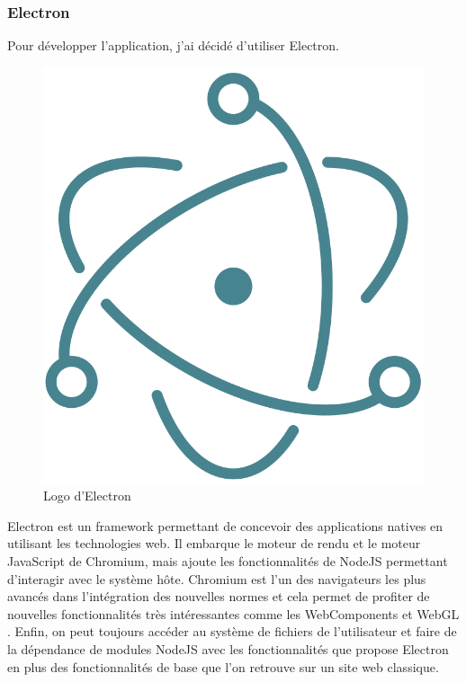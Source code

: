 \subsubsection{Electron}

Pour développer l'application, j'ai décidé d'utiliser Electron.

\begin{figure}[h]
    \centering
    \includegraphics[scale=0.2]{img/electron.png}
    \caption{Logo d’Electron}
\end{figure}

Electron est un framework permettant de concevoir des applications natives en utilisant les technologies web.
Il embarque le moteur de rendu et le moteur JavaScript de Chromium, mais ajoute les fonctionnalités de NodeJS permettant d'interagir avec le système hôte.
Chromium est l'un des navigateurs les plus avancés dans l'intégration des nouvelles normes et cela permet de profiter de nouvelles fonctionnalités très intéressantes comme les WebComponents et WebGL .
Enfin, on peut toujours accéder au système de fichiers de l'utilisateur et faire de la dépendance de modules NodeJS avec les fonctionnalités que propose Electron en plus des fonctionnalités de base que l'on retrouve sur un site web classique.

